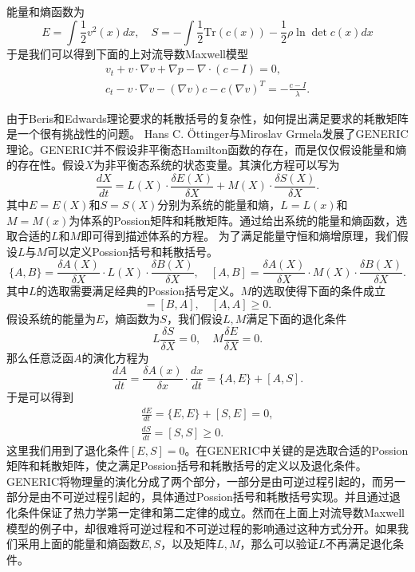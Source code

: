 能量和熵函数为
\begin{equation*}
	E = \int \frac{1}{2} v^2(x)dx, \quad S = -\int \frac{1}{2} \mbox{
 	Tr}(c(x))- \frac{1}{2} \rho \ln \det c(x) dx
\end{equation*}
于是我们可以得到下面的上对流导数Maxwell模型
\begin{subequations}\label{eq:chap1UCMmaxll}
\begin{align}
	v_t + v \cdot \nabla v + \nabla p  - \nabla \cdot (c - I) = 0, \\
	c_t - v \cdot \nabla v - (\nabla v)c - c (\nabla v)^T = -\frac{c-I}{\lambda}.
\end{align}
\end{subequations}

由于Beris和Edwards理论要求的耗散括号的复杂性，如何提出满足要求的耗散矩阵是一个很有挑战性的问题。
 Hans C. \"Ottinger与Miroslav Grmela发展了GENERIC理论\cite{ottinger2005beyond}。GENERIC并不假设非平衡态Hamilton函数的存在，而是仅仅假设能量和熵的存在性。假设$X$为非平衡态系统的状态变量。其演化方程可以写为
\begin{equation*}
	\frac{dX}{dt} = L(X) \cdot \frac{\delta E(X)}{\delta X} + M(X) \cdot \frac{\delta S(X)}{\delta X} .
\end{equation*}
其中$E=E(X)$和$S=S(X)$分别为系统的能量和熵，$L=L(x)$和$M=M(x)$为体系的Possion矩阵和耗散矩阵。通过给出系统的能量和熵函数，选取合适的$L$和$M$即可得到描述体系的方程。 为了满足能量守恒和熵增原理，我们假设$L$与$M$可以定义Possion括号和耗散括号。
\begin{equation*}
	\{ A,B \} = \frac{\delta A(X)}{\delta X} \cdot L(X) \cdot \frac{\delta B(X)}{\delta X}, \quad  [ A,B ] = \frac{\delta A(X)}{\delta X} \cdot M(X) \cdot \frac{\delta B(X)}{\delta X}. 
\end{equation*}
其中$L$的选取需要满足经典的Possion括号定义。$M$的选取使得下面的条件成立
\begin{equation*}
	[A,B] = [B,A], \quad [A,A] \ge 0.
\end{equation*}
假设系统的能量为$E$，熵函数为$S$，我们假设$L,M$满足下面的退化条件
\begin{equation}
	L \frac{\delta S}{\delta X} = 0, \quad M \frac{\delta E}{\delta X} = 0.
\end{equation}
那么任意泛函$A$的演化方程为
 \begin{equation*}
	\frac{d A}{dt} = \frac{\delta A(x)}{\delta x} \cdot \frac{dx}{dt} = \{ A,E\} + [A,S].
\end{equation*}
于是可以得到
\begin{eqnarray*}
	\frac{d E}{dt} = \{E,E\} +[S,E] = 0, \\
	\frac{d S}{dt} = [S,S] \ge 0. 
\end{eqnarray*}
这里我们用到了退化条件$[E,S] = 0$。在GENERIC中关键的是选取合适的Possion矩阵和耗散矩阵，使之满足Possion括号和耗散括号的定义以及退化条件。GENERIC将物理量的演化分成了两个部分，一部分是由可逆过程引起的，而另一部分是由不可逆过程引起的，具体通过Possion括号和耗散括号实现。并且通过退化条件保证了热力学第一定律和第二定律的成立。然而在上面上对流导数Maxwell模型的例子中，却很难将可逆过程和不可逆过程的影响通过这种方式分开。如果我们采用上面的能量和熵函数$E,S$，以及矩阵$L,M$，那么可以验证$L$不再满足退化条件。  

